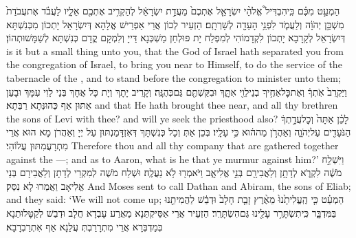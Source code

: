 {הַמְעַ֣ט מִכֶּ֗ם כִּֽי\maqqaf הִבְדִּיל֩ אֱלֹהֵ֨י יִשְׂרָאֵ֤ל אֶתְכֶם֙ מֵעֲדַ֣ת יִשְׂרָאֵ֔ל לְהַקְרִ֥יב אֶתְכֶ֖ם אֵלָ֑יו לַעֲבֹ֗ד אֶת\maqqaf עֲבֹדַת֙ מִשְׁכַּ֣ן יְהֹוָ֔ה וְלַעֲמֹ֛ד לִפְנֵ֥י הָעֵדָ֖ה לְשָׁרְתָֽם׃}
{הַזְעֵיר לְכוֹן אֲרֵי אַפְרֵישׁ אֱלָהָא דְּיִשְׂרָאֵל יָתְכוֹן מִכְּנִשְׁתָּא דְּיִשְׂרָאֵל לְקָרָבָא יָתְכוֹן לִקְדָמוֹהִי לְמִפְלַח יָת פּוּלְחַן מַשְׁכְּנָא דַּייָ וְלִמְקָם קֳדָם כְּנִשְׁתָּא לְשַׁמָּשׁוּתְהוֹן׃}
{is it but a small thing unto you, that the God of Israel hath separated you from the congregation of Israel, to bring you near to Himself, to do the service of the tabernacle of the \lord, and to stand before the congregation to minister unto them;}{}
{וַיַּקְרֵב֙ אֹֽתְךָ֔ וְאֶת\maqqaf כׇּל\maqqaf אַחֶ֥יךָ בְנֵי\maqqaf לֵוִ֖י אִתָּ֑ךְ וּבִקַּשְׁתֶּ֖ם גַּם\maqqaf כְּהֻנָּֽה׃}
{וְקָרֵיב יָתָךְ וְיָת כָּל אֲחָךְ בְּנֵי לֵוִי עִמָּךְ וּבָעַן אַתּוּן אַף כְּהוּנְּתָא רַבְּתָא׃}
{and that He hath brought thee near, and all thy brethren the sons of Levi with thee? and will ye seek the priesthood also?}{}
{לָכֵ֗ן אַתָּה֙ וְכׇל\maqqaf עֲדָ֣תְךָ֔ הַנֹּעָדִ֖ים עַל\maqqaf יְהֹוָ֑ה וְאַהֲרֹ֣ן מַה\maqqaf ה֔וּא כִּ֥י  עָלָֽיו׃}
{בְּכֵן אַתְּ וְכָל כְּנִשְׁתָּךְ דְּאִזְדָּמַנְתּוּן עַל יְיָ וְאַהֲרֹן מָא הוּא אֲרֵי מִתְרָעֲמִתּוּן עֲלוֹהִי׃}
{Therefore thou and all thy company that are gathered together against the \lord—; and as to Aaron, what is he that ye murmur against him?’}{}
{וַיִּשְׁלַ֣ח מֹשֶׁ֔ה לִקְרֹ֛א לְדָתָ֥ן וְלַאֲבִירָ֖ם בְּנֵ֣י אֱלִיאָ֑ב וַיֹּאמְר֖וּ לֹ֥א נַעֲלֶֽה׃}
{וּשְׁלַח מֹשֶׁה לְמִקְרֵי לְדָתָן וְלַאֲבִירָם בְּנֵי אֱלִיאָב וַאֲמַרוּ לָא נִסַּק׃}
{And Moses sent to call Dathan and Abiram, the sons of Eliab; and they said: ‘We will not come up;}{}
{הַמְעַ֗ט כִּ֤י הֶֽעֱלִיתָ֙נוּ֙ מֵאֶ֨רֶץ זָבַ֤ת חָלָב֙ וּדְבַ֔שׁ לַהֲמִיתֵ֖נוּ בַּמִּדְבָּ֑ר כִּֽי\maqqaf תִשְׂתָּרֵ֥ר עָלֵ֖ינוּ גַּם\maqqaf הִשְׂתָּרֵֽר׃}
{הַזְעֵיר אֲרֵי אַסֵּיקְתַּנָא מֵאֲרַע עָבְדָא חֲלָב וּדְבַשׁ לְקַטָּלוּתַנָא בְּמַדְבְּרָא אֲרֵי מִתְרָרַבְתְּ עֲלַנָא אַף אִתְרַבְרָבָא׃}
